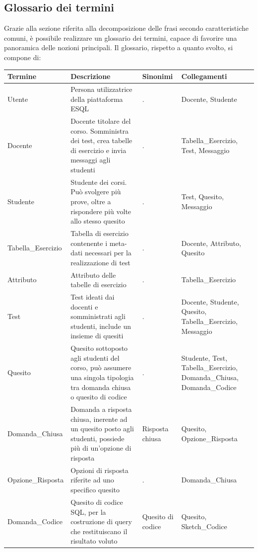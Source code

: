 \documentclass{article}
\begin{document}
\clearpage
\subsection{Glossario dei termini}
\large
Grazie alla sezione riferita alla decomposizione delle frasi secondo caratteristiche comuni, è possibile realizzare un glossario dei termini, capace di favorire una panoramica delle nozioni principali. Il glossario, rispetto a quanto svolto, si compone di:
\begin{table}[H]
    \centering
       \begin{tabularx}{\textwidth}{|X|p{6cm}|X|X|}
        \hline
        \bf Termine & \bf Descrizione & \bf Sinonimi & \bf Collegamenti \\
        \hline
        Utente & Persona utilizzatrice della piattaforma ESQL & . & Docente, Studente \\
        \hline
        Docente & Docente titolare del corso. Somministra dei test, crea tabelle di esercizio e invia messaggi agli studenti & . & Tabella\_Esercizio, Test, Messaggio \\
        \hline
        Studente & Studente dei corsi. Può svolgere più prove, oltre a rispondere più volte allo stesso quesito & . & Test, Quesito, Messaggio \\
        \hline
        Tabella\_Esercizio & Tabella di esercizio contenente i meta-dati necessari per la realizzazione di test & . & Docente, Attributo, Quesito \\
        \hline
        Attributo & Attributo delle tabelle di esercizio & . & Tabella\_Esercizio \\
        \hline
        Test & Test ideati dai docenti e somministrati agli studenti, include un insieme di quesiti & . & Docente, Studente, Quesito, Tabella\_Esercizio, Messaggio \\
        \hline 
        Quesito & Quesito sottoposto agli studenti del corso, può assumere una singola tipologia tra domanda chiusa o quesito di codice & . & Studente, Test, Tabella\_Esercizio, Domanda\_Chiusa, Domanda\_Codice \\
        \hline
        Domanda\_Chiusa & Domanda a risposta chiusa, inerente ad un quesito posto agli studenti, possiede più di un'opzione di risposta & Risposta chiusa & Quesito, Opzione\_Risposta \\
        \hline
        Opzione\_Risposta & Opzioni di risposta riferite ad uno specifico quesito & . & Domanda\_Chiusa \\
        \hline
        Domanda\_Codice & Quesito di codice SQL, per la costruzione di query che restituiscano il risultato voluto & Quesito di codice & Quesito, Sketch\_Codice \\

\end{tabularx}
\end{table}
\end{document}
